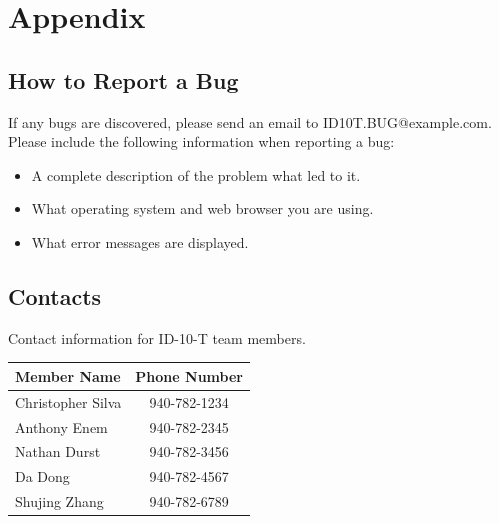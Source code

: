 \documentclass{scrreprt}
\begin{document}
	{\let\clearpage\relax \chapter{Appendix}}
	
	\section{How to Report a Bug}
	If any bugs are discovered, please send an email to ID10T.BUG@example.com.\\
	Please include the following information when reporting a bug:\\
	\begin{itemize}
		\item A complete description of the problem what led to it.
		\item What operating system and web browser you are using.
		\item What error messages are displayed.
	\end{itemize}
	
	\section{Contacts}
		Contact information for ID-10-T team members.\\
		\begin{tabular}{|l|c|}
			\hline
			Member Name       & Phone Number \\ \hline
			Christopher Silva & 940-782-1234 \\ \hline
			Anthony Enem      & 940-782-2345 \\ \hline
			Nathan Durst      & 940-782-3456 \\ \hline
			Da Dong           & 940-782-4567 \\ \hline
			Shujing Zhang     & 940-782-6789 \\ \hline
		\end{tabular}
\end{document}
